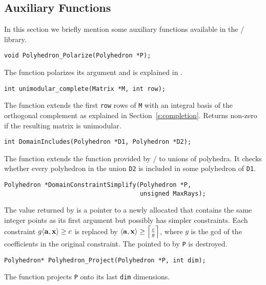 \subsection{Auxiliary Functions}

In this section we briefly mention some auxiliary functions
available in the \barvinok/ library.

\begin{verbatim}
void Polyhedron_Polarize(Polyhedron *P);
\end{verbatim}
The function  
polarizes its argument and is explained
in .

\begin{verbatim}
int unimodular_complete(Matrix *M, int row);
\end{verbatim}
The function  extends
the first \verb+row+ rows of
\verb+M+ with an integral basis of the orthogonal complement
as explained in Section~\ref{s:completion}.
Returns non-zero
if the resulting matrix is unimodular.

\begin{verbatim}
int DomainIncludes(Polyhedron *D1, Polyhedron *D2);
\end{verbatim}
The function  extends
the function 
provided by \PolyLib/ 
to unions of polyhedra.
It checks whether every polyhedron in the union {\tt D2}
is included in some polyhedron of {\tt D1}.

\begin{verbatim}
Polyhedron *DomainConstraintSimplify(Polyhedron *P, 
                                     unsigned MaxRays);
\end{verbatim}
The value returned by
 is a pointer to
a newly allocated  that contains the 
same integer points as its first argument but possibly
has simpler constraints.
Each constraint $ g \sp a x \ge c $
is replaced by $ \sp a x \ge \ceil{ \frac c g } $,
where $g$ is the \ac{gcd} of the coefficients in the original
constraint.
The  pointed to by \verb+P+ is destroyed.

\begin{verbatim}
Polyhedron* Polyhedron_Project(Polyhedron *P, int dim);
\end{verbatim}
The function  projects
\verb+P+ onto its last \verb+dim+ dimensions.

